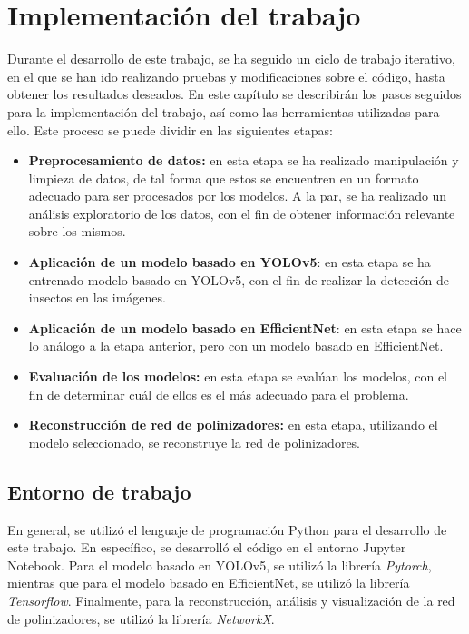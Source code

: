 \chapter{Implementación del trabajo}
\label{chapter:implementacion}

Durante el desarrollo de este trabajo, se ha seguido un ciclo de trabajo iterativo, en el que se han ido realizando pruebas y modificaciones sobre el código, hasta obtener los resultados deseados. En este capítulo se describirán los pasos seguidos para la implementación del trabajo, así como las herramientas utilizadas para ello. Este proceso se puede dividir en las siguientes etapas:
\begin{itemize}
    \item \textbf{Preprocesamiento de datos:} en esta etapa se ha realizado manipulación y limpieza de datos, de tal forma que estos se encuentren en un formato adecuado para ser procesados por los modelos. A la par, se ha realizado un análisis exploratorio de los datos, con el fin de obtener información relevante sobre los mismos.
    \item \textbf{Aplicación de un modelo basado en YOLOv5}: en esta etapa se ha entrenado modelo basado en YOLOv5, con el fin de realizar la detección de insectos en las imágenes.
    \item \textbf{Aplicación de un modelo basado en EfficientNet}: en esta etapa se hace lo análogo a la etapa anterior, pero con un modelo basado en EfficientNet.
    \item \textbf{Evaluación de los modelos:} en esta etapa se evalúan los modelos, con el fin de determinar cuál de ellos es el más adecuado para el problema.
    \item \textbf{Reconstrucción de red de polinizadores:} en esta etapa, utilizando el modelo seleccionado, se reconstruye la red de polinizadores.
\end{itemize}

\section{Entorno de trabajo}

En general, se utilizó el lenguaje de programación Python para el desarrollo de este trabajo. En específico, se desarrolló el código en el entorno Jupyter Notebook. Para el modelo basado en YOLOv5, se utilizó la librería \textit{Pytorch}, mientras que para el modelo basado en EfficientNet, se utilizó la librería \textit{Tensorflow}. Finalmente, para la reconstrucción, análisis y visualización de la red de polinizadores, se utilizó la librería \textit{NetworkX}.


